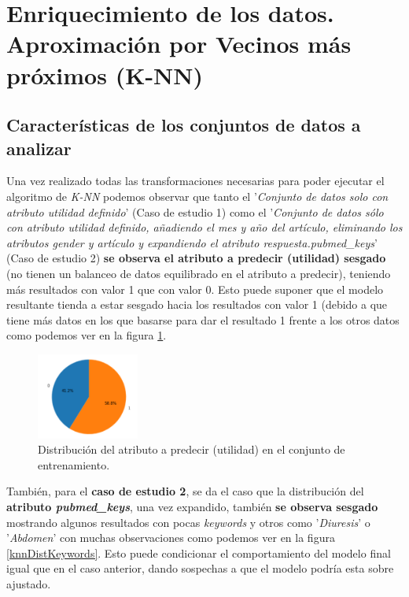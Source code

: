 \section{Enriquecimiento de los datos. Aproximación por Vecinos más próximos (K-NN)}
\label{resultados:knn}

\subsection{Características de los conjuntos de datos a analizar}
\label{resultados:knn_caracteristicas}
Una vez realizado todas las transformaciones necesarias para poder ejecutar el algoritmo de \textit{K-NN} podemos observar que tanto el '\textit{Conjunto de datos solo con atributo utilidad definido}' (Caso de estudio 1) como el '\textit{Conjunto de datos sólo con atributo utilidad definido, añadiendo el mes y año del artículo, eliminando los atributos gender y artículo y expandiendo el atributo respuesta.pubmed\_keys}' (Caso de estudio 2) \textbf{se observa el atributo a predecir (utilidad) sesgado}\cite{ref:sesgo} (no tienen un balanceo de datos equilibrado en el atributo a predecir), teniendo más resultados con valor 1 que con valor 0. Esto puede suponer que el modelo resultante tienda a estar sesgado\cite{ref:sesgo} hacia los resultados con valor 1 (debido a que tiene más datos en los que basarse para dar el resultado 1 frente a los otros datos como podemos ver en la figura \ref{knnDistUtilidad}.

\begin{figure}[!htb]
  \centering
    \includegraphics[width=0.3\textwidth]{images/resultados_knn_conjunto1.png}
    \caption{Distribución del atributo a predecir (utilidad) en el conjunto de entrenamiento.}
  \label{knnDistUtilidad}
\end{figure}

También, para el \textbf{caso de estudio 2}, se da el caso que la distribución del \textbf{atributo \textit{pubmed\_keys}}, una vez expandido, también \textbf{se observa sesgado} mostrando algunos resultados con pocas \textit{keywords} y otros como '\textit{Diuresis}' o '\textit{Abdomen}' con muchas observaciones como podemos ver en la figura \ref{knnDistKeywords}. Esto puede condicionar el comportamiento del modelo final igual que en el caso anterior, dando sospechas a que el modelo podría esta sobre ajustado\cite{ref:knn_overfiting}.

